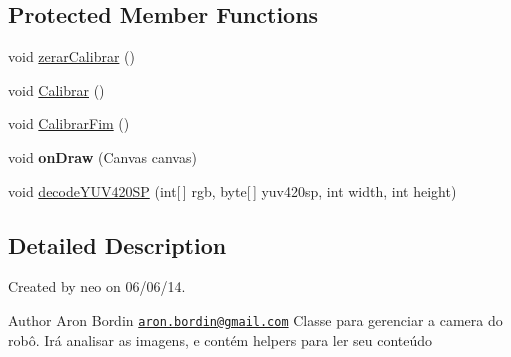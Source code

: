 \subsection*{Protected Member Functions}
\begin{DoxyCompactItemize}
\item 
void \hyperlink{classcom_1_1aronbordin_1_1robo_1_1camera_1_1CameraRobo_a704dc5a516ffce7a2eac4e421469163e}{zerar\+Calibrar} ()
\item 
void \hyperlink{classcom_1_1aronbordin_1_1robo_1_1camera_1_1CameraRobo_ae0899639ec813e5e16cc88b5a105acdd}{Calibrar} ()
\item 
void \hyperlink{classcom_1_1aronbordin_1_1robo_1_1camera_1_1CameraRobo_adcbe43b99dd1a3e9ef9133ddfc890b0e}{Calibrar\+Fim} ()
\item 
\hypertarget{classcom_1_1aronbordin_1_1robo_1_1camera_1_1CameraRobo_a1ddfd5a73b58dc9330c03ffb661420cc}{void {\bfseries on\+Draw} (Canvas canvas)}\label{classcom_1_1aronbordin_1_1robo_1_1camera_1_1CameraRobo_a1ddfd5a73b58dc9330c03ffb661420cc}

\item 
void \hyperlink{classcom_1_1aronbordin_1_1robo_1_1camera_1_1CameraRobo_ac95f2722132d4dd85d7bca5b9cd9ce7b}{decode\+Y\+U\+V420\+S\+P} (int\mbox{[}$\,$\mbox{]} rgb, byte\mbox{[}$\,$\mbox{]} yuv420sp, int width, int height)
\end{DoxyCompactItemize}


\subsection{Detailed Description}
Created by neo on 06/06/14. \begin{DoxyAuthor}{Author}
Aron Bordin \href{mailto:aron.bordin@gmail.com}{\tt aron.\+bordin@gmail.\+com} Classe para gerenciar a camera do robô. Irá analisar as imagens, e contém helpers para ler seu conteúdo 
\end{DoxyAuthor}


